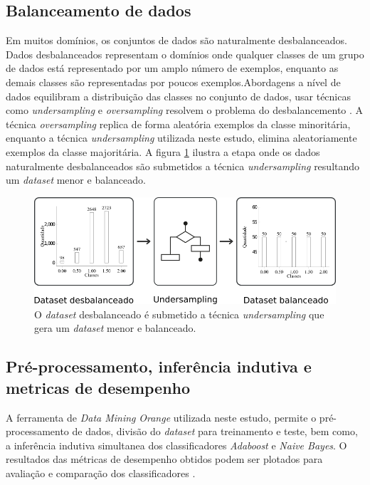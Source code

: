\subsection{Balanceamento de dados}

Em muitos domínios, os conjuntos de dados são naturalmente desbalanceados. 
Dados desbalanceados representam o domínios onde qualquer classes de um grupo 
de dados está representado por um amplo número de exemplos, enquanto as demais 
classes são representadas por poucos exemplos.Abordagens a nível de dados 
equilibram a distribuição das classes no conjunto de dados, usar técnicas como 
\textit{undersampling} e \textit{oversampling} resolvem o problema do 
desbalancemento \cite{ferreiraestudo}. A técnica \textit{oversampling} replica 
de forma aleatória exemplos da classe minoritária, enquanto a técnica 
\textit{undersampling} utilizada neste estudo, elimina aleatoriamente exemplos 
da classe majoritária. A figura \ref{figure:metodologia_2} ilustra a etapa onde 
os dados naturalmente desbalanceados são submetidos a técnica 
\textit{undersampling} resultando um \textit{dataset} menor e balanceado.

\begin{figure}[H]
\begin{center}
    \includegraphics[scale=0.70]{images/metodologia_2.png}
\end{center}
\caption{O \textit{dataset} desbalanceado é submetido a técnica
\textit{undersampling} que gera um \textit{dataset} menor e balanceado.}
\label{figure:metodologia_2}
\end{figure}

\subsection{Pré-processamento, inferência indutiva e metricas de desempenho}

A ferramenta de \textit{Data Mining} \textit{Orange} utilizada neste estudo, 
permite o pré-processamento de dados, divisão do \textit{dataset} para 
treinamento e teste, bem como, a inferência indutiva simultanea dos 
classificadores \textit{Adaboost} e \textit{Naive Bayes}. O resultados das 
métricas de desempenho obtidos podem ser plotados para avaliação e comparação 
dos classificadores \cite{wahbeh2011comparison}.

